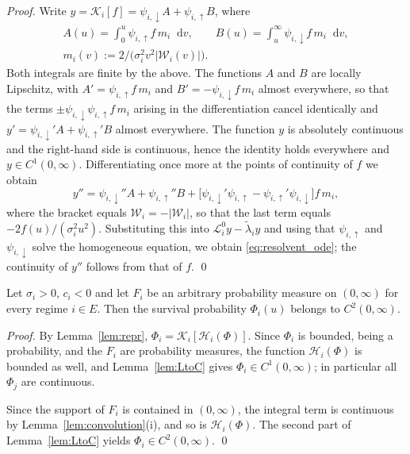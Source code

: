 \documentclass[smallextended]{svjour3}
\newcommand{\diff}{\mathop{}\!\mathrm{d}}
\begin{document}
\begin{proof}
Write $y=\mathcal K_i[f]=\psi_{i,\downarrow}A+\psi_{i,\uparrow}B$, where
\begin{gather*}
A(u)=\int_0^u\psi_{i,\uparrow}f\,m_i\diff v ,
\qquad
B(u)=\int_u^\infty\psi_{i,\downarrow}f\,m_i\diff v , \\
m_i(v):=2\bigl/\bigl(\sigma_i^2v^2|\mathcal W_i(v)|\bigr) .
\end{gather*}
Both integrals are finite by the above. The functions $A$ and $B$ are locally
Lipschitz, with $A'=\psi_{i,\uparrow}f\,m_i$ and
$B'=-\psi_{i,\downarrow}f\,m_i$ almost everywhere, so that the terms
$\pm\psi_{i,\downarrow}\psi_{i,\uparrow}f\,m_i$ arising in the differentiation
cancel identically and
$y'=\psi_{i,\downarrow}'A+\psi_{i,\uparrow}'B$ almost everywhere. The function
$y$ is absolutely continuous and the right-hand side is continuous, hence the
identity holds everywhere and $y\in C^1(0,\infty)$. Differentiating once more
at the points of continuity of $f$ we obtain
$$
y''=\psi_{i,\downarrow}''A+\psi_{i,\uparrow}''B
+\bigl[\psi_{i,\downarrow}'\psi_{i,\uparrow}
-\psi_{i,\uparrow}'\psi_{i,\downarrow}\bigr]f\,m_i ,
$$
where the bracket equals $\mathcal W_i=-|\mathcal W_i|$, so that the last term
equals $-2f(u)/(\sigma_i^2u^2)$. Substituting this into
$\mathcal L^0_iy-\tilde\lambda_iy$ and using that $\psi_{i,\uparrow}$ and
$\psi_{i,\downarrow}$ solve the homogeneous equation, we obtain
\eqref{eq:resolvent_ode}; the continuity of $y''$ follows from that of $f$.
\qed
\end{proof}

\begin{theorem}
\label{thm:annuity_case}
Let $\sigma_i>0$, $c_i<0$ and let $F_i$ be an arbitrary probability measure on
$(0,\infty)$ for every regime $i\in E$. Then the survival probability
$\Phi_i(u)$ belongs to $C^2(0,\infty)$.
\end{theorem}

\begin{proof}
By Lemma~\ref{lem:repr}, $\Phi_i=\mathcal K_i[\mathcal H_i(\Phi)]$. Since
$\Phi_i$ is bounded, being a probability, and the $F_i$ are probability
measures, the function $\mathcal H_i(\Phi)$ is bounded as well, and
Lemma~\ref{lem:LtoC} gives $\Phi_i\in C^1(0,\infty)$; in particular all
$\Phi_j$ are continuous.

Since the support of $F_i$ is contained in $(0,\infty)$, the integral term is
continuous by Lemma~\ref{lem:convolution}{\rm(i)}, and so is
$\mathcal H_i(\Phi)$. The second part of Lemma~\ref{lem:LtoC} yields
$\Phi_i\in C^2(0,\infty)$.
\qed
\end{proof}
\end{document}

